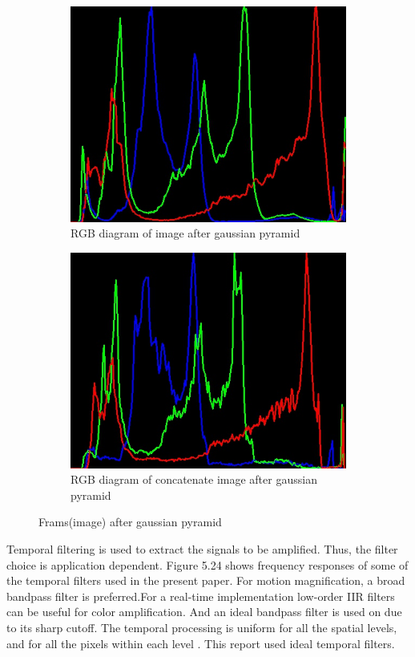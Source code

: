 \begin{figure}[!h]
\begin{subfigure}{.45\textwidth}
  \centering
  \includegraphics[scale=0.4]{img/eulerian/sample/orginalRGB}
  \caption{RGB diagram of image after gaussian pyramid}
  \label{fig:sub2}
\end{subfigure}
\begin{subfigure}{.45\textwidth}
  \centering
  \includegraphics[scale=0.4]{img/eulerian/sample/nextRGB}
  \caption{RGB diagram of concatenate image after gaussian pyramid}
  \label{fig:sub2}
\end{subfigure}
\caption{Frams(image) after gaussian pyramid}
\label{fig:test}
\end{figure}

\newpage
Temporal filtering is used to extract the signals to be amplified. Thus, the filter choice is application dependent. Figure 5.24 shows frequency responses of some of the temporal filters used in the present paper. For motion magnification, a broad bandpass filter is preferred.For a real-time implementation low-order IIR filters can be useful for color amplification. And an ideal bandpass filter is used on due to its sharp cutoff. The temporal processing is uniform for all the spatial levels, and for all the pixels within each level \cite{Rubinstein}. This report used ideal temporal filters. \\

